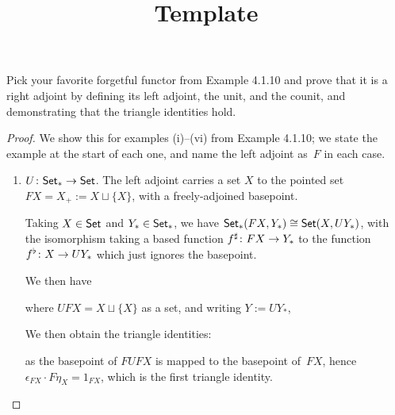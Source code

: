 \documentclass[../../solutions]{subfiles}
\title{Template}
\author{}
\begin{document}
\maketitle

%

\begin{exercise}
  Pick your favorite forgetful functor from Example 4.1.10 and prove
  that it is a right adjoint by defining its left adjoint, the unit,
  and the counit, and demonstrating that the triangle identities
  hold.
\end{exercise}

\begin{proof}
  We show this for examples (i)--(vi) from Example 4.1.10; we state
  the example at the start of each one, and name the left adjoint
  as~$F$ in each case.

  \begin{enumerate}[label=(\roman*)]
  \item ${U}\colon{\ensuremath{\mathsf{Set}_*}}\to{\ensuremath{\mathsf{Set}}}$.  The left adjoint carries a set $X$
    to the pointed set $FX=X_+:= X\sqcup\{X\}$, with a freely-adjoined
    basepoint.

    Taking $X\in\mathsf{Set}$ and $Y_*\in\mathsf{Set}_*$, we have
    $\mathsf{Set}_*(FX, Y_*)\cong \mathsf{Set}(X,UY_*)$, with the isomorphism taking a
    based function ${f^\sharp}\colon{FX}\to{Y_*}$ to the function
    ${f^\flat}\colon{X}\to{UY_*}$ which just ignores the basepoint.

    We then have
    \begin{center}
    \end{center}
    where $UFX=X\sqcup\{X\}$ as a set, and writing $Y:=UY_*$,
    \begin{center}
    \end{center}

    We then obtain the triangle identities:
    \begin{center}
    \end{center}
    as the basepoint of $FUFX$ is mapped to the basepoint of~$FX$,
    hence $\epsilon_{FX}\cdot F\eta_X=1_{FX}$, which is the first
    triangle identity.


\end{enumerate}
\end{proof}
\end{document}
